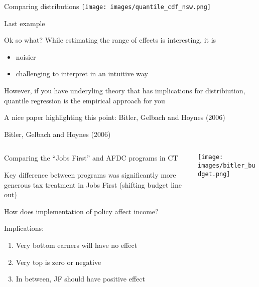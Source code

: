 \documentclass[notes,11pt, aspectratio=169]{beamer}
\newenvironment{wideitemize}{\itemize\addtolength{\itemsep}{10pt}}{\enditemize}
\begin{document}
\begin{frame}{Comparing distributions}
        \texttt{[image: images/quantile\_cdf\_nsw.png]}
\end{frame}

\begin{frame}{Last example}
  \begin{wideitemize}
  \item Ok so what? While estimating the range of effects is interesting, it is
    \begin{itemize}
    \item noisier
    \item challenging to interpret in an intuitive way
    \end{itemize}
  \item However, if you have underyling theory that has implications for
    distribiution, quantile regression is the empirical approach for you
  \item A nice paper highlighting this point: Bitler, Gelbach and Hoynes (2006)
  \end{wideitemize}
\end{frame}

\begin{frame}{Bitler, Gelbach and Hoynes (2006)}
  \begin{columns}[T] %
\begin{column}{.5\textwidth}
  \begin{wideitemize}
  \item Comparing the ``Jobs First'' and AFDC programs in CT
  \item Key difference between programs was significantly more
    generous tax treatment in Jobs First (shifting budget line out)
  \item How does implementation of policy affect income?
  \item Implications:
    \begin{enumerate}
    \item Very bottom earners will have no effect
    \item Very top is zero or negative
    \item In between, JF should have positive effect
    \end{enumerate}
  \end{wideitemize}
  \end{column}%
  \hfill%
  \begin{column}{.5\textwidth}
    \texttt{[image: images/bitler\_budget.png]}
  \end{column}
\end{columns}
\end{frame}
\end{document}
